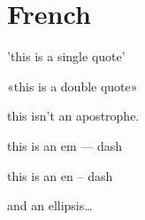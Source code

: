 
\def\mytitle{MultiMarkdown French Test}


\part{French}
\label{french}

'this is a single quote'

«this is a double quote»

this isn't an apostrophe.

this is an em --- dash

this is an en -- dash

and an ellipsis{\ldots}




